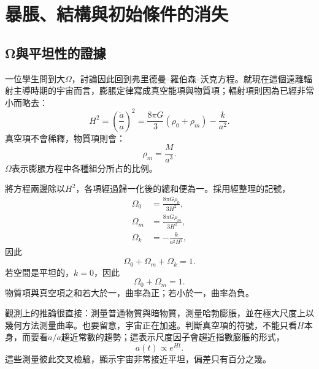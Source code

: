 \chapter{暴脹、結構與初始條件的消失}

\section{{\proseunicodefont Ω}與平坦性的證據}

一位學生問到大\(\Omega\)，討論因此回到弗里德曼–羅伯森–沃克方程。就現在這個遠離輻射主導時期的宇宙而言，膨脹定律寫成真空能項與物質項；輻射項則因為已經非常小而略去：
\begin{equation}
H^2=\left(\frac{\dot a}{a}\right)^2=\frac{8\pi G}{3}\left(\rho_0+\rho_m\right)-\frac{k}{a^2}.
\end{equation}
真空項不會稀釋，物質項則會：
\begin{equation}
\rho_m=\frac{M}{a^3}.
\end{equation}
\(\Omega\)表示膨脹方程中各種組分所占的比例。

將方程兩邊除以\(H^2\)，各項經過歸一化後的總和便為一。採用經整理的記號，
\begin{equation}
\begin{aligned}
\Omega_0&=\frac{8\pi G\rho_0}{3H^2},\\
\Omega_m&=\frac{8\pi G\rho_m}{3H^2},\\
\Omega_k&=-\frac{k}{a^2H^2},
\end{aligned}
\end{equation}
因此
\begin{equation}
\Omega_0+\Omega_m+\Omega_k=1.
\end{equation}
若空間是平坦的，\(k=0\)，因此
\begin{equation}
\Omega_0+\Omega_m=1.
\end{equation}
物質項與真空項之和若大於一，曲率為正；若小於一，曲率為負。

觀測上的推論很直接：測量普通物質與暗物質，測量哈勃膨脹，並在極大尺度上以幾何方法測量曲率。也要留意，宇宙正在加速。判斷真空項的符號，不能只看\(H\)本身，而要看\(\dot a/a\)趨近常數的趨勢；這表示尺度因子會趨近指數膨脹的形式，
\begin{equation}
a(t)\propto e^{Ht}.
\end{equation}
這些測量彼此交叉檢驗，顯示宇宙非常接近平坦，偏差只有百分之幾。

\begin{classroomqa}
\end{classroomqa}

